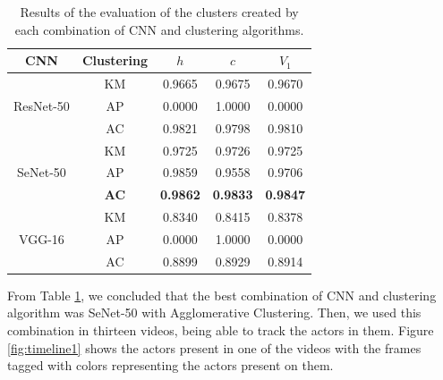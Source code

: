 \begin{table}[!ht]
\centering
\small
\caption{Results of the evaluation of the clusters created by each combination of CNN and clustering algorithms.}
\begin{tabular}{@{}ccccc@{}}
\toprule
\textbf{CNN} & \textbf{Clustering} & \textbf{$h$} & \textbf{$c$} & \textbf{$V_1$} \\ \midrule
                  & KM                  & 0.9665                     & 0.9675                      & 0.9670             \\
ResNet-50         & AP                  & 0.0000                     & 1.0000                      & 0.0000             \\
                  & AC                  & 0.9821                     & 0.9798                      & 0.9810             \\ \midrule
                  & KM                  & 0.9725                     & 0.9726                      & 0.9725             \\
SeNet-50          & AP                  & 0.9859                     & 0.9558                      & 0.9706             \\
                  & \textbf{AC}         & \textbf{0.9862}            & \textbf{0.9833}             & \textbf{0.9847}    \\ \midrule
                  & KM                  & 0.8340                     & 0.8415                      & 0.8378             \\
VGG-16            & AP                  & 0.0000                     & 1.0000                      & 0.0000             \\
                  & AC                  & 0.8899                     & 0.8929                      & 0.8914             \\
\end{tabular}
\label{tab:results_clustering}
\vspace{-1em}
\end{table}

From Table \ref{tab:results_clustering}, we concluded that the best combination of CNN and clustering algorithm was SeNet-50 with Agglomerative Clustering. Then, we used this combination in thirteen videos, being able to track the actors in them. Figure \ref{fig:timeline1} shows the actors present in one of the videos with the frames tagged with colors representing the actors present on them.

